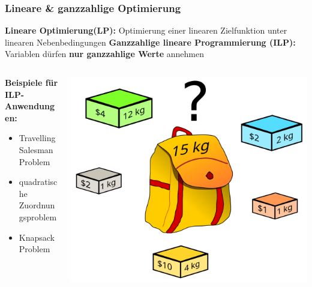 \documentclass[9pt]{beamer}
\begin{document}
    \begin{frame}
    \frametitle{Lineare \& ganzzahlige Optimierung}
    \textbf{Lineare Optimierung(LP):} Optimierung einer linearen Zielfunktion unter linearen Nebenbedingungen \newline
    \textbf{Ganzzahlige lineare Programmierung (ILP):} Variablen dürfen \textbf{nur ganzzahlige Werte }annehmen
    \vspace{0.5em}
    \pause \newline
    \begin{columns}
    \begin{column}{0.5\textwidth}
        
    \textbf{Beispiele für ILP-Anwendungen:}
    
    \begin{itemize}
        \item Travelling Salesman Problem
        \item quadratische Zuordnungsproblem
        \item Knapsack Problem
    \end{itemize}
    \end{column}
    \begin{column}{0.3\textwidth}
    \centering
    \includegraphics[width=\textwidth]{figures/Knapsack.png}
  \end{column}
\end{columns}
    \end{frame}
\end{document}
